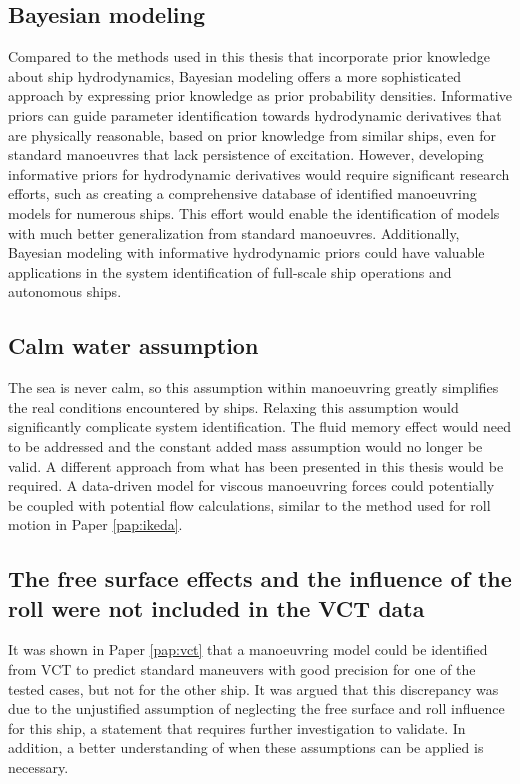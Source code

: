 \subsection*{Bayesian modeling}
Compared to the methods used in this thesis that incorporate prior knowledge about ship hydrodynamics, Bayesian modeling offers a more sophisticated approach by expressing prior knowledge as prior probability densities. Informative priors can guide parameter identification towards hydrodynamic derivatives that are physically reasonable, based on prior knowledge from similar ships, even for standard manoeuvres that lack persistence of excitation. However, developing informative priors for hydrodynamic derivatives would require significant research efforts, such as creating a comprehensive database of identified manoeuvring models for numerous ships. This effort would enable the identification of models with much better generalization from standard manoeuvres. Additionally, Bayesian modeling with informative hydrodynamic priors could have valuable applications in the system identification of full-scale ship operations and autonomous ships. 

\subsection*{Calm water assumption}
The sea is never calm, so this assumption within manoeuvring greatly simplifies the real conditions encountered by ships. Relaxing this assumption would significantly complicate system identification. The fluid memory effect would need to be addressed and the constant added mass assumption would no longer be valid. A different approach from what has been presented in this thesis would be required. A data-driven model for viscous manoeuvring forces could potentially be coupled with potential flow calculations, similar to the method used for roll motion in Paper \ref{pap:ikeda}.
    
\subsection*{The free surface effects and the influence of the roll were not included in the VCT data}
It was shown in Paper \ref{pap:vct} that a manoeuvring model could be identified from VCT to predict standard maneuvers with good precision for one of the tested cases, but not for the other ship. It was argued that this discrepancy was due to the unjustified assumption of neglecting the free surface and roll influence for this ship, a statement that requires further investigation to validate. In addition, a better understanding of when these assumptions can be applied is necessary.  
        
